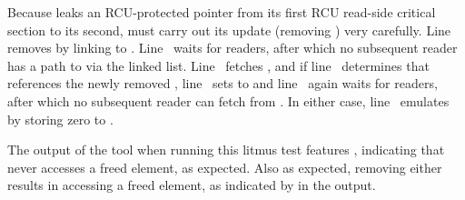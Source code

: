\begin{fcvref}
Because  leaks an RCU-protected pointer from its first
RCU read-side critical section to its second,  must carry
out its update (removing ) very carefully.
Line~ removes  by linking  to .
Line~ waits for readers, after which no subsequent reader
has a path to  via the linked list.
Line~ fetches , and if line~
determines that  references the newly removed ,
line~ sets  to 
and line~ again waits for readers, after which no
subsequent reader can fetch  from .
In either case, line~ emulates  by storing
zero to .

\QuickQuizEnd

The output of the  tool when running this litmus test features
, indicating that  never accesses a freed element,
as expected.
Also as expected, removing either  results
in  accessing a freed element, as indicated by 
in the  output.
\end{fcvref}

